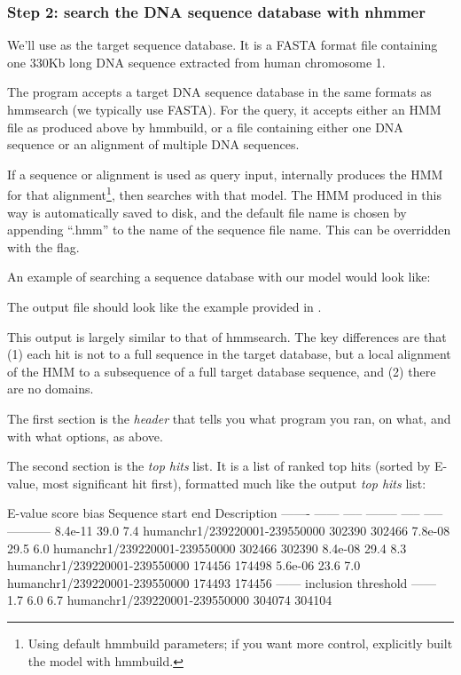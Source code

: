 \subsubsection{Step 2: search the DNA sequence database with nhmmer}

We'll use  as the target sequence database. It is
a FASTA format file containing one 330Kb long DNA sequence extracted from human
chromosome 1.

The program  accepts a target DNA sequence database in the
same formats as hmmsearch (we typically use FASTA). For the query, it accepts
either an HMM file as produced above by hmmbuild, or a file containing either
one DNA sequence or an alignment of multiple DNA sequences. 

If a sequence or alignment is used as query input, 
internally produces the HMM for that alignment\footnote{Using default
  hmmbuild parameters; if you want more control, explicitly built the
  model with hmmbuild.}, then searches with that model. The HMM
produced in this way is automatically saved to disk, and the default
file name is chosen by appending ``.hmm'' to the name of the sequence
file name. This can be overridden with the  flag.

An example of searching a sequence database with our  model
would look like:


The output file  should look like the example provided in
.

This output is largely similar to that of hmmsearch. The key differences are
that (1) each hit is not to a full sequence in the target database, but a
local alignment of the HMM to a subsequence of a full target database sequence,
and (2) there are no domains.

The first section is the \emph{header} that tells you what program you ran, on
what, and with what options, as above.

The second section is the \emph{top hits} list. It is a list
of ranked top hits (sorted by E-value, most significant hit first),
formatted much like the  output \emph{top hits} list:

\begin{samepage}
\begin{sreoutput}
    E-value  score  bias  Sequence                       start    end  Description
    ------- ------ -----  --------                       -----  -----  -----------
    8.4e-11   39.0   7.4  humanchr1/239220001-239550000 302390 302466
    7.8e-08   29.5   6.0  humanchr1/239220001-239550000 302466 302390
    8.4e-08   29.4   8.3  humanchr1/239220001-239550000 174456 174498
    5.6e-06   23.6   7.0  humanchr1/239220001-239550000 174493 174456
  ------ inclusion threshold ------
        1.7    6.0   6.7  humanchr1/239220001-239550000 304074 304104
\end{sreoutput}
\end{samepage}

